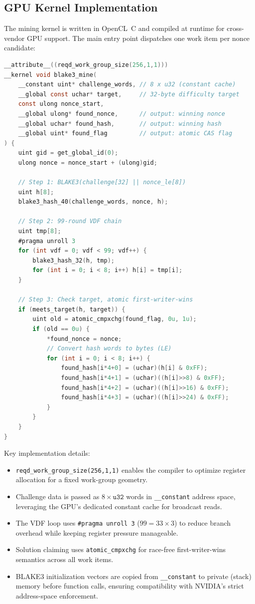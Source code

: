 \documentclass[11pt,a4paper]{article}
\begin{document}
\subsection{GPU Kernel Implementation}

The mining kernel is written in OpenCL~C and compiled at runtime for cross-vendor GPU support. The main entry point dispatches one work item per nonce candidate:

\begin{lstlisting}[language=C, caption=OpenCL Mining Kernel (v10.1.8)]
__attribute__((reqd_work_group_size(256,1,1)))
__kernel void blake3_mine(
    __constant uint* challenge_words, // 8 x u32 (constant cache)
    __global const uchar* target,     // 32-byte difficulty target
    const ulong nonce_start,
    __global ulong* found_nonce,      // output: winning nonce
    __global uchar* found_hash,       // output: winning hash
    __global uint* found_flag         // output: atomic CAS flag
) {
    uint gid = get_global_id(0);
    ulong nonce = nonce_start + (ulong)gid;

    // Step 1: BLAKE3(challenge[32] || nonce_le[8])
    uint h[8];
    blake3_hash_40(challenge_words, nonce, h);

    // Step 2: 99-round VDF chain
    uint tmp[8];
    #pragma unroll 3
    for (int vdf = 0; vdf < 99; vdf++) {
        blake3_hash_32(h, tmp);
        for (int i = 0; i < 8; i++) h[i] = tmp[i];
    }

    // Step 3: Check target, atomic first-writer-wins
    if (meets_target(h, target)) {
        uint old = atomic_cmpxchg(found_flag, 0u, 1u);
        if (old == 0u) {
            *found_nonce = nonce;
            // Convert hash words to bytes (LE)
            for (int i = 0; i < 8; i++) {
                found_hash[i*4+0] = (uchar)(h[i] & 0xFF);
                found_hash[i*4+1] = (uchar)((h[i]>>8) & 0xFF);
                found_hash[i*4+2] = (uchar)((h[i]>>16) & 0xFF);
                found_hash[i*4+3] = (uchar)((h[i]>>24) & 0xFF);
            }
        }
    }
}
\end{lstlisting}

Key implementation details:
\begin{itemize}
    \item \texttt{reqd\_work\_group\_size(256,1,1)} enables the compiler to optimize register allocation for a fixed work-group geometry.
    \item Challenge data is passed as $8 \times \mathtt{u32}$ words in \texttt{\_\_constant} address space, leveraging the GPU's dedicated constant cache for broadcast reads.
    \item The VDF loop uses \texttt{\#pragma unroll 3} ($99 = 33 \times 3$) to reduce branch overhead while keeping register pressure manageable.
    \item Solution claiming uses \texttt{atomic\_cmpxchg} for race-free first-writer-wins semantics across all work items.
    \item BLAKE3 initialization vectors are copied from \texttt{\_\_constant} to private (stack) memory before function calls, ensuring compatibility with NVIDIA's strict address-space enforcement.
\end{itemize}
\end{document}
